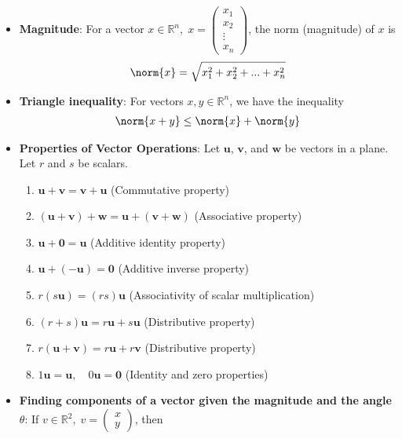 \documentclass{report}
\begin{document}
    \begin{itemize}
        \item \textbf{Magnitude}: For a vector $x\in\mathbb{R}^{n},\; x=\begin{pmatrix} x_{1} \\ x_{2} \\ \vdots \\x_{n} \end{pmatrix}$, the norm (magnitude) of $x$ is 
            \begin{align*}
                \norm{x} = \sqrt{x_{1}^{2} + x_{2}^{2} + ... + x_{n}^{2}} 
            \end{align*}
        \item \textbf{Triangle inequality}: For vectors $x,y \in \mathbb{R}^{n}$, we have the inequality
            \begin{align*}
                \norm{x + y} \leq \norm{x} + \norm{y}
            \end{align*}
        \item \textbf{Properties of Vector Operations}:
        Let $\mathbf{u}$, $\mathbf{v}$, and $\mathbf{w}$ be vectors in a plane. Let $r$ and $s$ be scalars.
        \begin{enumerate}
            \item $\mathbf{u} + \mathbf{v} = \mathbf{v} + \mathbf{u}$ \quad (Commutative property)
            \item $(\mathbf{u} + \mathbf{v}) + \mathbf{w} = \mathbf{u} + (\mathbf{v} + \mathbf{w})$ \quad (Associative property)
            \item $\mathbf{u} + \mathbf{0} = \mathbf{u}$ \quad (Additive identity property)
            \item $\mathbf{u} + (-\mathbf{u}) = \mathbf{0}$ \quad (Additive inverse property)
            \item $r(s\mathbf{u}) = (rs)\mathbf{u}$ \quad (Associativity of scalar multiplication)
            \item $(r + s)\mathbf{u} = r\mathbf{u} + s\mathbf{u}$ \quad (Distributive property)
            \item $r(\mathbf{u} + \mathbf{v}) = r\mathbf{u} + r\mathbf{v}$ \quad (Distributive property)
            \item $1\mathbf{u} = \mathbf{u}, \quad 0\mathbf{u} = \mathbf{0}$ \quad (Identity and zero properties)
        \end{enumerate}
    \item \textbf{Finding components of a vector given the magnitude and the angle $\theta$}: If $v \in \mathbb{R}^{2},\; v = \begin{pmatrix} x \\ y \end{pmatrix}$, then

\end{itemize}
\end{document}
